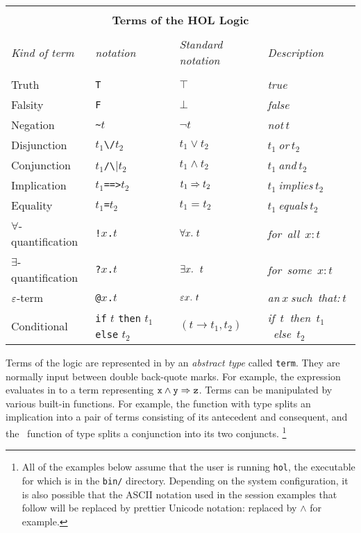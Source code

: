 \begin{center}
\begin{tabular}{|l|l|l|l|} \hline
\multicolumn{4}{|c|}{ } \\
\multicolumn{4}{|c|}{\bf Terms of the HOL Logic} \\
\multicolumn{4}{|c|}{ } \\
{\it Kind of term} & {\it \HOL{} notation} &
{\it Standard notation} &
{\it Description} \\ \hline
 & & & \\
Truth & {\small\verb|T|} & $\top$ & {\it true}\\ \hline
Falsity & {\small\verb|F|} & $\bot$ & {\it false}\\ \hline
Negation & {\small\verb|~|}$t$ & $\neg t$ & {\it not}$\ t$\\ \hline
Disjunction & $t_1${\small\verb|\/|}$t_2$ & $t_1\vee t_2$ &
$t_1\ ${\it or}$\ t_2$ \\ \hline
Conjunction & $t_1${\small\verb|/\|}$t_2$ & $t_1\wedge t_2$ &
$t_1\ ${\it and}$\ t_2$ \\ \hline
Implication & $t_1${\small\verb|==>|}$t_2$ & $t_1\Rightarrow t_2$ &
$t_1\ ${\it implies}$\ t_2$ \\ \hline
Equality & $t_1${\small\verb|=|}$t_2$ & $t_1 = t_2$ &
$t_1\ ${\it equals}$\ t_2$ \\ \hline
$\forall$-quantification & {\small\verb|!|}$x${\small\verb|.|}$t$ &
$\forall x.\ t$ & {\it for\ all\ }$x: t$ \\ \hline
$\exists$-quantification & {\small\verb|?|}$x${\small\verb|.|}$t$ &
$\equant{x}\ t$ & {\it for\ some\ }$x: t$ \\ \hline
$\varepsilon$-term & {\small\verb|@|}$x${\small\verb|.|}$t$ &
$\varepsilon x.\ t$ & {\it an}$\ x\ ${\it such\ that:}$\ t$ \\ \hline
Conditional & {\small\verb|if|} $t$ {\small\verb|then|} $t_1$
              {\small\verb|else|} $t_2$ &
$(t\rightarrow t_1, t_2)$ & {\it if\ }$t${\it \ then\ }$t_1${\it\ else\ }$t_2$
 \\ \hline
\end{tabular}
\end{center}\label{logic-table}

Terms of the \HOL{} logic are represented in \ML{} by an \emph{abstract type} called {\small\verb|term|}.
They are normally input between double back-quote marks.
For example, the expression  evaluates in \ML{} to a term representing $\holtxt{x} \land \holtxt{y} \Rightarrow \holtxt{z}$.
Terms can be manipulated by various built-in \ML{} functions.
For example, the \ML{} function  with \ML{} type  splits an implication into a pair of terms consisting of its antecedent and consequent, and the \ML\ function  of type  splits a conjunction into its two conjuncts.%
\footnote{All of the examples below assume that the user is running \texttt{hol}, the executable for which is in the \texttt{bin/} directory.
Depending on the system configuration, it is also possible that the ASCII notation used in the session examples that follow will be replaced by prettier Unicode notation: \holtxt{/\bs} replaced by $\land$ for example.}

